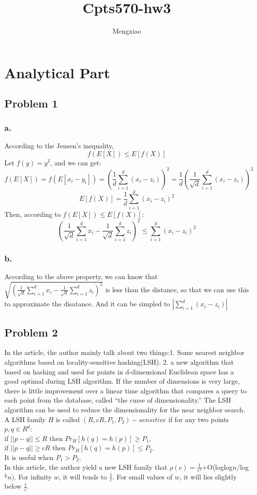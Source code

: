 \documentclass[12pt]{article}
\author{Mengxiao}
\title{Cpts570-hw3}
\begin{document}
	\maketitle
	\pagebreak
	\section{Analytical Part}
		\subsection{Problem 1}
			\subsubsection{a.}
				According to the Jensen's inequality,
				$$f(E[X])\leq E[f(X)]$$
				Let $f(y)=y^2$, and we can get:
				$$f(E[X])=f(E[x_i-y_i])=(\frac{1}{d}\sum_{i=1}^d(x_i-z_i))^2=\frac{1}{d}(\frac{1}{\sqrt{d}}\sum_{i=1}^d(x_i-z_i))^2$$
				$$E[f(X)]=\frac{1}{d}\sum_{i=1}^d(x_i-z_i)^2$$
				Then, according to $f(E[X])\leq E[f(X)]$:
				$$(\frac{1}{\sqrt{d}}\sum_{i=1}^dx_i-\frac{1}{\sqrt{d}}\sum_{i=1}^dz_i)^2\leq\sum_{i=1}^d(x_i-z_i)^2$$
			\subsubsection{b.}
				According to the above property, we can know that $\sqrt{(\frac{1}{\sqrt{d}}\sum_{i=1}^dx_i-\frac{1}{\sqrt{d}}\sum_{i=1}^dz_i)^2}$ is less than the distance, so that we can use this to approximate the disatance. And it can be simpled to $|\sum_{i=1}^d(x_i-z_i)|$
		\subsection{Problem 2}
			In the article, the author mainly talk about two things:1. Some nearest neighbor algorithms based on locality-sensitive hashing(LSH). 2. a new algorithm that based on hashing and used for points in d-dimensional Euclidean space has a good optimal during LSH algorithm. If the number of dimensions is very large, there is little improvement over a linear time algorithm that compares a query to each point from the database, called “the curse of dimensionality.” The LSH algorithm can be used to reduce the dimensionality for the near neighbor search. A LSH family $H$ is called $(R,cR,P_1,P_2)-sensitive$ if for any two points$p,q\in R^d$:
\\if $||p-q||\leq R$ then $Pr_H[h(q)=h(p)]\geq P_1$,
\\if $||p-q||\geq cR$ then $Pr_H[h(q)=h(p)]\leq P_2$.
\\It is useful when $P_1>P_2$.\\
			In this article, the author yield a new LSH family that $\rho(c)=\frac{1}{c^2}$+O(loglog$n$/log$^\frac{1}{3}n)$. For infinity $w$, it will tends to $\frac{1}{c}$. For small values of $w$, it will lies slightly below $\frac{1}{c}$.
\end{document}
